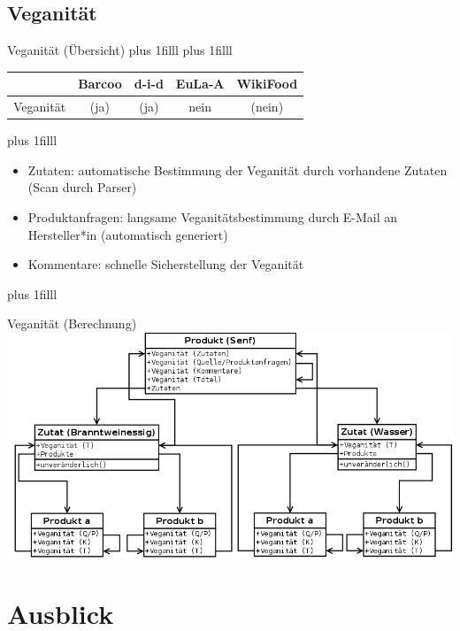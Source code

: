 \documentclass{beamer}
\begin{document}
\subsection*{Veganität}
\begin{frame}{Veganität (Übersicht)}
	\vskip0pt plus 1filll
	\vskip0pt plus 1filll
		\begin{tabular}{|c|c|c|c|c|}
				\hline
				& Barcoo & d-i-d & EuLa-A & WikiFood\\
				\hline
				Veganität & (ja) & (ja) & nein & (nein)\\
				\hline
	\end{tabular}

	\vskip0pt plus 1filll
	\begin{exampleblock}{}
	\centering
	\begin{itemize}
			\item Zutaten: automatische Bestimmung der
					Veganität durch vorhandene Zutaten (Scan durch
					Parser)
			\item Produktanfragen: langsame Veganitätsbestimmung durch
					E-Mail an Hersteller*in (automatisch generiert)
			\item Kommentare: schnelle Sicherstellung der Veganität
				\end{itemize}
		\end{exampleblock}
	\vskip0pt plus 1filll
\end{frame}


\begin{frame}{Veganität (Berechnung)}
	\centering
	\includegraphics[scale=0.25]{pics/calculate_veganity_de.png}\\
\end{frame}


\section{Ausblick}
\end{document}
